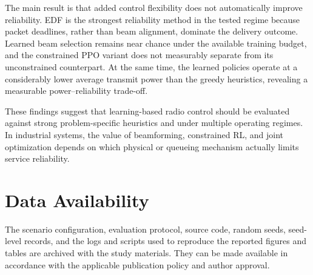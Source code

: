 \documentclass[number]{autarticle}
\begin{document}
The main result is that added control flexibility does not automatically improve reliability. EDF is the strongest reliability method in the tested regime because packet deadlines, rather than beam alignment, dominate the delivery outcome. Learned beam selection remains near chance under the available training budget, and the constrained PPO variant does not measurably separate from its unconstrained counterpart. At the same time, the learned policies operate at a considerably lower average transmit power than the greedy heuristics, revealing a measurable power--reliability trade-off.

These findings suggest that learning-based radio control should be evaluated against strong problem-specific heuristics and under multiple operating regimes. In industrial systems, the value of beamforming, constrained RL, and joint optimization depends on which physical or queueing mechanism actually limits service reliability.

\section{Data Availability}\label{data-availability}
The scenario configuration, evaluation protocol, source code, random seeds, seed-level records, and the logs and scripts used to reproduce the reported figures and tables are archived with the study materials. They can be made available in accordance with the applicable publication policy and author approval.
\end{document}
